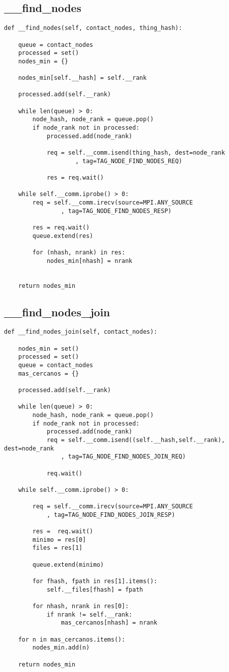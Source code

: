 \subsection{\_\_find\_nodes}
\begin{lstlisting}
def __find_nodes(self, contact_nodes, thing_hash):

    queue = contact_nodes
    processed = set()
    nodes_min = {}

    nodes_min[self.__hash] = self.__rank

    processed.add(self.__rank)

    while len(queue) > 0:
        node_hash, node_rank = queue.pop()
        if node_rank not in processed:
            processed.add(node_rank)

            req = self.__comm.isend(thing_hash, dest=node_rank
					, tag=TAG_NODE_FIND_NODES_REQ)

            res = req.wait()

    while self.__comm.iprobe() > 0:
        req = self.__comm.irecv(source=MPI.ANY_SOURCE
				, tag=TAG_NODE_FIND_NODES_RESP)

        res = req.wait()
        queue.extend(res)

        for (nhash, nrank) in res:
            nodes_min[nhash] = nrank


    return nodes_min
\end{lstlisting}

\subsection{\_\_find\_nodes\_join}
\begin{lstlisting}
def __find_nodes_join(self, contact_nodes):

    nodes_min = set()
    processed = set()
    queue = contact_nodes
    mas_cercanos = {}

    processed.add(self.__rank)
                
    while len(queue) > 0:
        node_hash, node_rank = queue.pop()                                 
        if node_rank not in processed:
            processed.add(node_rank)
            req = self.__comm.isend((self.__hash,self.__rank), dest=node_rank
				, tag=TAG_NODE_FIND_NODES_JOIN_REQ)

            req.wait()

    while self.__comm.iprobe() > 0:

        req = self.__comm.irecv(source=MPI.ANY_SOURCE
			, tag=TAG_NODE_FIND_NODES_JOIN_RESP)

        res =  req.wait()
        minimo = res[0]
        files = res[1]

        queue.extend(minimo)

        for fhash, fpath in res[1].items():
            self.__files[fhash] = fpath

        for nhash, nrank in res[0]:
            if nrank != self.__rank:
                mas_cercanos[nhash] = nrank

    for n in mas_cercanos.items():
        nodes_min.add(n)

    return nodes_min
\end{lstlisting}

